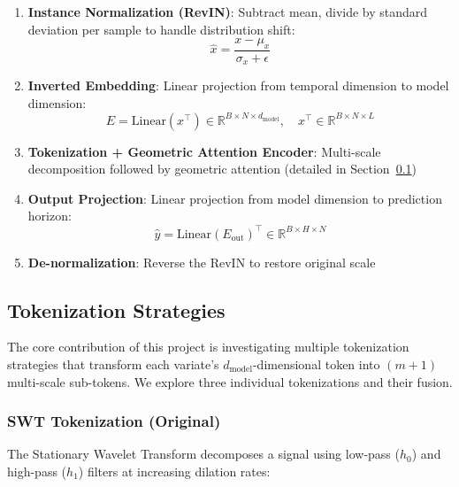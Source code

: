 \documentclass[12pt,a4paper]{article}
\begin{document}
\begin{enumerate}
  \item \textbf{Instance Normalization (RevIN)}: Subtract mean, divide by standard deviation per sample to handle distribution shift:
  \begin{equation}
    \hat{x} = \frac{x - \mu_x}{\sigma_x + \epsilon}
  \end{equation}

  \item \textbf{Inverted Embedding}: Linear projection from temporal dimension to model dimension:
  \begin{equation}
    E = \text{Linear}(x^\top) \in \mathbb{R}^{B \times N \times d_\text{model}}, \quad x^\top \in \mathbb{R}^{B \times N \times L}
  \end{equation}

  \item \textbf{Tokenization + Geometric Attention Encoder}: Multi-scale decomposition followed by geometric attention (detailed in Section~\ref{sec:tokenization})

  \item \textbf{Output Projection}: Linear projection from model dimension to prediction horizon:
  \begin{equation}
    \hat{y} = \text{Linear}(E_\text{out})^\top \in \mathbb{R}^{B \times H \times N}
  \end{equation}

  \item \textbf{De-normalization}: Reverse the RevIN to restore original scale
\end{enumerate}

\subsection{Tokenization Strategies}
\label{sec:tokenization}

The core contribution of this project is investigating multiple tokenization strategies that transform each variate's $d_\text{model}$-dimensional token into $(m{+}1)$ multi-scale sub-tokens. We explore three individual tokenizations and their fusion.

\subsubsection{SWT Tokenization (Original)}

The Stationary Wavelet Transform decomposes a signal using low-pass ($h_0$) and high-pass ($h_1$) filters at increasing dilation rates:
\end{document}
